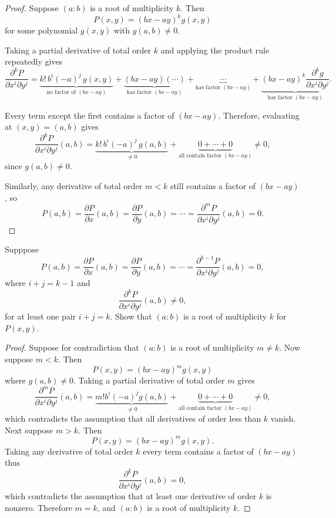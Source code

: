 \begin{proof}
Suppose $(a:b)$ is a root of multiplicity $k$. Then
\[
P(x,y) = (bx-ay)^k g(x,y)
\]
for some polynomial $g(x,y)$ with $g(a,b)\ne 0$.

Taking a partial derivative of total order $k$ and applying the product rule repeatedly gives
\[
\frac{\partial^k P}{\partial x^i \partial y^j}
=
\underbrace{
k! \, b^i (-a)^j \, g(x,y)
}_{\text{no factor of }(bx-ay)}
+
\underbrace{
(bx-ay)(\cdots)
}_{\text{has factor }(bx-ay)}
+
\underbrace{
\cdots
}_{\text{has factor }(bx-ay)}
+
\underbrace{
(bx-ay)^k \frac{\partial^k g}{\partial x^i \partial y^j}
}_{\text{has factor }(bx-ay)}.
\]

Every term except the first contains a factor of $(bx-ay)$. Therefore, evaluating at $(x,y)=(a,b)$ gives
\[
\frac{\partial^k P}{\partial x^i \partial y^j}(a,b)
=
\underbrace{
k! \, b^i (-a)^j \, g(a,b)
}_{\ne 0}
+
\underbrace{0 + \cdots + 0}_{\text{all contain factor }(bx-ay)}
\ne 0,
\]
since $g(a,b)\ne 0$.

Similarly, any derivative of total order $m<k$ still contains a factor of $(bx-ay)$, so
\[
P(a,b)
=
\frac{\partial P}{\partial x}(a,b)
=
\frac{\partial P}{\partial y}(a,b)
=
\cdots
=
\frac{\partial^m P}{\partial x^i \partial y^j}(a,b)
=
0.
\]
\end{proof}


\begin{tcolorbox}[title=Problem 9, breakable]
    Supppose 
    \[P(a, b) = \frac{\partial P}{\partial x}(a, b) = \frac{\partial P}{\partial y}(a, b) = \cdots = \frac{\partial^{k - 1} P}{\partial x^i \partial y^j}(a, b) = 0,\]
    where $i + j =  k - 1$ and 
    \[\frac{\partial^k P}{\partial x^i \partial y^j}(a, b) \ne 0,\]
    for at least one pair $i + j = k$. Show that $(a : b)$ is a root of multiplicity $k$ for $P(x, y)$.
\end{tcolorbox}

\begin{proof}
    Suppose for contradiction that $(a:b)$ is a root of multiplicity $m \ne k$.
    Now suppose $m < k$. Then
    \[
    P(x,y) = (bx-ay)^m g(x,y)
    \]
    where $g(a,b)\ne 0$.
    Taking a partial derivative of total order $m$ gives
    \[
    \frac{\partial^m P}{\partial x^i \partial y^j}(a,b)
    =
    \underbrace{m! b^i (-a)^j g(a,b)}_{\ne 0}
    +
    \underbrace{0 + \cdots + 0}_{\text{all contain factor }(bx-ay)}
    \ne 0,
    \]
    which contradicts the assumption that all derivatives of order less than $k$ vanish.
    Next suppose $m > k$. Then
    \[
    P(x,y) = (bx-ay)^m g(x,y).
    \]
    Taking any derivative of total order $k$ every term contains a factor of $(bx-ay)$ thus
    \[
    \frac{\partial^k P}{\partial x^i \partial y^j}(a,b) = 0,
    \]
    which contradicts the assumption that at least one derivative of order $k$ is nonzero.
    Therefore $m=k$, and $(a:b)$ is a root of multiplicity $k$.
\end{proof}

